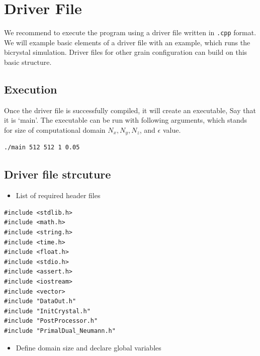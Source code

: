 \documentclass[11pt]{article}
\begin{document}
\section{Driver File}

We recommend to execute the program using a driver file written in \texttt{.cpp} format.
We will example basic elements of a driver file 
with an example, which runs the bicrystal simulation.
Driver files for other grain configuration can build on this basic structure. 

\subsection{Execution}

Once the driver file is successfully compiled, it will create an executable, 
Say that it is `main'. The executable can be run with following arguments, 
which stands for size of computational domain $N_x,N_y,N_z$, 
and $\epsilon$ value. 
 
\begin{tcolorbox}[colback=white]
\begin{lstlisting}[basicstyle=\footnotesize]
./main 512 512 1 0.05
\end{lstlisting}
\end{tcolorbox}

\subsection{Driver file strcuture}
\begin{itemize} \item List of required header files \end{itemize}
\begin{tcolorbox}
\begin{lstlisting}[basicstyle=\footnotesize]
#include <stdlib.h>
#include <math.h>
#include <string.h>
#include <time.h>
#include <float.h>
#include <stdio.h>
#include <assert.h>
#include <iostream>
#include <vector>
#include "DataOut.h"
#include "InitCrystal.h"
#include "PostProcessor.h"
#include "PrimalDual_Neumann.h"
\end{lstlisting}
\end{tcolorbox}

\begin{itemize} \item Define domain size and declare global variables \end{itemize}
\end{document}
